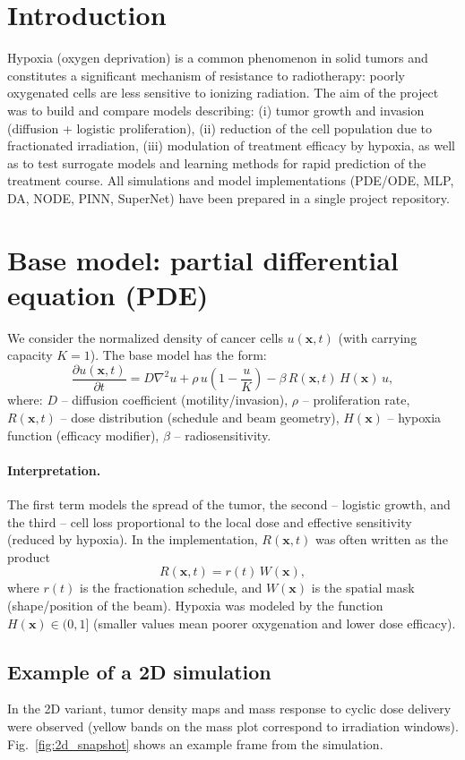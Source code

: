 \documentclass{article}
\begin{document}
\section{Introduction}
Hypoxia (oxygen deprivation) is a common phenomenon in solid tumors and constitutes a significant mechanism of resistance to radiotherapy:
poorly oxygenated cells are less sensitive to ionizing radiation.
The aim of the project was to build and compare models describing:
(i) tumor growth and invasion (diffusion + logistic proliferation),
(ii) reduction of the cell population due to fractionated irradiation,
(iii) modulation of treatment efficacy by hypoxia,
as well as to test surrogate models and learning methods for rapid prediction of the treatment course.
All simulations and model implementations (PDE/ODE, MLP, DA, NODE, PINN, SuperNet) have been prepared in a single project repository.

\section{Base model: partial differential equation (PDE)}
We consider the normalized density of cancer cells $u(\mathbf{x},t)$ (with carrying capacity $K=1$).
The base model has the form:
\begin{equation}
\frac{\partial u(\mathbf{x}, t)}{\partial t}
=
D \nabla^2 u
+ \rho\, u\left(1-\frac{u}{K}\right)
- \beta\, R(\mathbf{x}, t)\, H(\mathbf{x})\, u,
\label{eq:pde}
\end{equation}
where:
$D$ -- diffusion coefficient (motility/invasion),
$\rho$ -- proliferation rate,
$R(\mathbf{x},t)$ -- dose distribution (schedule and beam geometry),
$H(\mathbf{x})$ -- hypoxia function (efficacy modifier),
$\beta$ -- radiosensitivity.

\paragraph{Interpretation.}
The first term models the spread of the tumor, the second -- logistic growth,
and the third -- cell loss proportional to the local dose and effective sensitivity (reduced by hypoxia).
In the implementation, $R(\mathbf{x},t)$ was often written as the product
\[
R(\mathbf{x},t)= r(t)\,W(\mathbf{x}),
\]
where $r(t)$ is the fractionation schedule, and $W(\mathbf{x})$ is the spatial mask (shape/position of the beam).
Hypoxia was modeled by the function $H(\mathbf{x})\in(0,1]$ (smaller values mean poorer oxygenation and lower dose efficacy).

\subsection{Example of a 2D simulation}
In the 2D variant, tumor density maps and mass response to cyclic dose delivery were observed
(yellow bands on the mass plot correspond to irradiation windows).
Fig.~\ref{fig:2d_snapshot} shows an example frame from the simulation.
\end{document}

